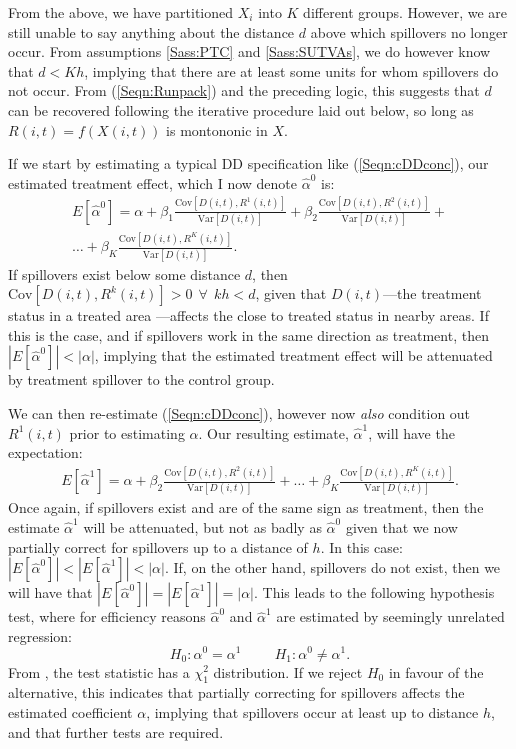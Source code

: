 \documentclass[12pt]{article}
\newcommand{\Var}{\mathrm{Var}}
\newcommand{\Cov}{\mathrm{Cov}}
\newcommand{\Bias}[2]{\frac{\Cov[#1,#2]}{\Var[#1]}}
\begin{document}
\begin{spacing}{1.3}
From the above, we have partitioned $X_i$ into $K$ different groups. However, we
are still unable to say anything about the distance $d$ above which spillovers no 
longer occur. From assumptions \ref{Sass:PTC} and \ref{Sass:SUTVAs}, we do 
however know that $d<Kh$, implying that there are at least some units for whom 
spillovers do not occur.  From (\ref{Seqn:Runpack}) and the preceding logic, this 
suggests that $d$ can be recovered following the iterative procedure laid out 
below, so long as $R(i,t)=f(X(i,t))$ is montononic in $X$.

If we start by estimating a typical DD specification like (\ref{Seqn:cDDconc}),
our estimated treatment effect, which I now denote $\hat\alpha^0$ is:
\begin{equation}
\nonumber
\begin{split}
E[\hat\alpha^0]=\alpha + \beta_1\Bias{D(i,t)}{R^1(i,t)}
                                + \beta_2\Bias{D(i,t)}{R^2(i,t)}
                                + \\ \ldots
                                + \beta_K\Bias{D(i,t)}{R^K(i,t)}.
\end{split}
\end{equation}
If spillovers exist below some distance $d$, then $\Cov[D(i,t),R^k(i,t)]>0 \ \ 
\forall \ \ kh<d$, given that $D(i,t)$---the treatment status in a treated area%
---affects the close to treated status in nearby areas. If this is the case, and 
if spillovers work in the same direction as treatment, then 
$|E[\hat\alpha^0]|<|\alpha|$, implying that the estimated treatment 
effect will be attenuated by treatment spillover to the control group.  

We can then re-estimate (\ref{Seqn:cDDconc}), however now \emph{also} condition
out $R^1(i,t)$ prior to estimating $\alpha$.  Our resulting estimate, 
$\hat\alpha^1$, will have the expectation:
\begin{equation}
\nonumber
\begin{split}
E[\hat\alpha^1]=\alpha + \beta_2\Bias{D(i,t)}{R^2(i,t)}
                                + \ldots
                                + \beta_K\Bias{D(i,t)}{R^K(i,t)}.
\end{split}
\end{equation}
Once again, if spillovers exist and are of the same sign as treatment, then the
estimate $\hat\alpha^1$ will be attenuated, but not as badly as $\hat\alpha^0$ 
given that we now partially correct for spillovers up to a distance of $h$.  In 
this case: $|E[\hat\alpha^0]|<|E[\hat\alpha^1]|<|\alpha|$.  If, on the other 
hand, spillovers do not exist, then we will have that 
$|E[\hat\alpha^0]|=|E[\hat\alpha^1]|=|\alpha|$.  This leads to 
the following hypothesis test, where for efficiency reasons $\hat\alpha^0$
and $\hat\alpha^1$ are estimated by seemingly unrelated regression:
\[
H_0: \alpha^0=\alpha^1 \hspace{1cm}
H_1: \alpha^0\neq\alpha^1.
\]
From \citet{Zellner1962}, the test statistic has a $\chi^2_1$ distribution. If 
we reject $H_0$ in favour of the alternative, this indicates that partially 
correcting for spillovers affects the estimated coefficient $\alpha$, implying 
that spillovers occur at least up to distance $h$, and that further tests are 
required.  


\end{spacing}
\end{document}
